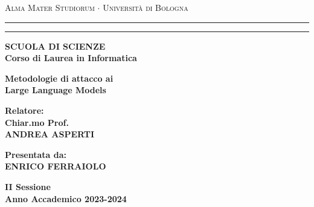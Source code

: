 \begin{titlepage}
\begin{center}
{{\Large{\textsc{Alma Mater Studiorum $\cdot$ Universit\`a di
Bologna}}}} \rule[0.1cm]{15.8cm}{0.1mm}
\rule[0.5cm]{15.8cm}{0.6mm}
{\small{\bf SCUOLA DI SCIENZE\\
Corso di Laurea in Informatica }}
\end{center}
\vspace{15mm}
\begin{center}
{\LARGE{\bf Metodologie di attacco ai}}\\
\vspace{3mm}
{\LARGE{\bf Large Language Models}}\\
\end{center}
\vspace{40mm}
\par
\noindent
\begin{minipage}[t]{0.47\textwidth}
{\large{\bf Relatore:\\
Chiar.mo Prof.\\
ANDREA ASPERTI}}
\end{minipage}
\hfill
\begin{minipage}[t]{0.47\textwidth}\raggedleft
{\large{\bf Presentata da:\\
ENRICO FERRAIOLO}}
\end{minipage}
\vspace{20mm}
\begin{center}
{\large{\bf II Sessione\\%
Anno Accademico 2023-2024}}%
\end{center}
\end{titlepage}